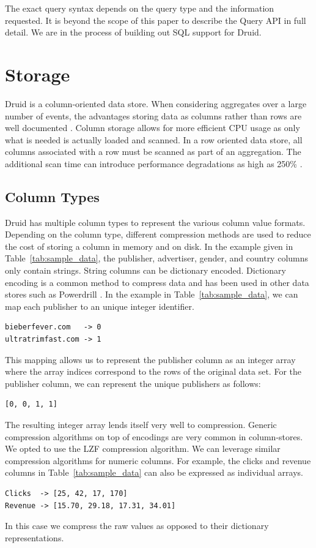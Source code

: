 \documentclass{vldb}
\begin{document}
The exact query syntax depends on the query type and the information requested.
It is beyond the scope of this paper to describe the Query API in full detail.
We are in the process of building out SQL support for Druid.

\section{Storage}
\label{sec:storage}
Druid is a column-oriented data store. When considering aggregates
over a large number of events, the advantages storing data as columns
rather than rows are well documented \cite{cattell2011scalable}. Column storage allows for
more efficient CPU usage as only what is needed is actually loaded and
scanned. In a row oriented data store, all columns associated with a
row must be scanned as part of an aggregation. The additional scan
time can introduce performance degradations as high as 250\% \cite{bear2012vertica}.

\subsection{Column Types}
Druid has multiple column types to represent the various column value
formats. Depending on the column type, different compression methods
are used to reduce the cost of storing a column in memory and on
disk. In the example given in Table~\ref{tab:sample_data}, the
publisher, advertiser, gender, and country columns only contain
strings. String columns can be dictionary encoded. Dictionary encoding
is a common method to compress data and has been used in other data
stores such as Powerdrill \cite{hall2012processing}. In the example in
Table~\ref{tab:sample_data}, we can map each publisher to an unique
integer identifier.
\begin{verbatim}
bieberfever.com   -> 0
ultratrimfast.com -> 1
\end{verbatim}
This mapping allows us to represent the publisher column as an integer
array where the array indices correspond to the rows of the original
data set. For the publisher column, we can represent the unique
publishers as follows:
\begin{verbatim}
[0, 0, 1, 1]
\end{verbatim}

The resulting integer array lends itself very well to
compression. Generic compression algorithms on top of encodings are
very common in column-stores. We opted to use the LZF \cite{liblzf2013} compression
algorithm. We can leverage similar compression algorithms for numeric
columns. For example, the clicks and revenue columns in
Table~\ref{tab:sample_data} can also be expressed as individual
arrays.
\begin{verbatim}
Clicks  -> [25, 42, 17, 170]
Revenue -> [15.70, 29.18, 17.31, 34.01]
\end{verbatim}
In this case we compress the raw values as opposed to their dictionary
representations.
\end{document}
